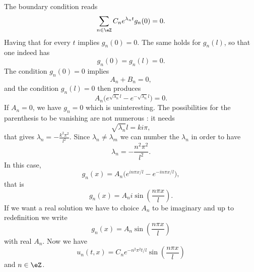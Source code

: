 The boundary condition reads
\begin{equation}
    \sum_{n\in \eZ}C_n e^{\lambda_n t}g_n(0)=0.
\end{equation}
Having that for every \( t\) implies \( g_n(0)=0\). The same holds for \( g_n(l)\), so that one indeed has
\begin{equation}
    g_n(0)=g_n(l)=0.
\end{equation}
The condition \( g_n(0)=0\) implies
\begin{equation}
    A_n+B_n=0,
\end{equation}
and the condition \( g_n(l)=0\) then produces
\begin{equation}
    A_n\big(  e^{\sqrt{ \lambda_n }l}- e^{-\sqrt{ \lambda_n }l} \big)=0.
\end{equation}
If \( A_n=0\), we have \( g_n=0\) which is uninteresting. The possibilities for the parenthesis to be vanishing are not numerous : it needs
\begin{equation}
    \sqrt{ \lambda_n }l=ki\pi,
\end{equation}
that gives $\lambda_n=-\frac{ k^2\pi^2 }{ l^2 }$. Since \( \lambda_n\neq \lambda_m\) we can number the \( \lambda_n\) in order to have
\begin{equation}
    \lambda_n=-\frac{ n^2\pi^2 }{ l^2 }.
\end{equation}
In this case,
\begin{equation}
    g_n(x)=A_n\big( e^{in\pi x/l}-  e^{-in\pi x/l} \big),
\end{equation}
that is
\begin{equation}
    g_n(x)=A_ni\sin\left( \frac{ n\pi x }{ l } \right).
\end{equation}
If we want a real solution we have to choice \( A_n\) to be imaginary and up to redefinition we write
\begin{equation}
    g_n(x)=A_n\sin\left( \frac{ n\pi x }{ l } \right)
\end{equation}
with real \( A_n\). Now we have
\begin{equation}
    u_n(t,x)=C_n e^{-n^2\pi^2 t/l}\sin\left( \frac{ n\pi x }{ l } \right)
\end{equation}
and \( n\in \eZ\). 

